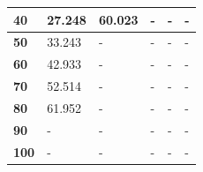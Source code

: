 \begin{table}[H]
\begin{tabular}{|l|l|l|l|l|l|}
\textbf{40}                               & 27.248          & 60.023           & -                & -                & -                \\ \hline
\textbf{50}                               & 33.243          & -                & -                & -                & -                \\ \hline
\textbf{60}                               & 42.933          & -                & -                & -                & -                \\ \hline
\textbf{70}                               & 52.514          & -                & -                & -                & -                \\ \hline
\textbf{80}                               & 61.952          & -                & -                & -                & -                \\ \hline
\textbf{90}                               & -               & -                & -                & -                & -                \\ \hline
\textbf{100}                              & -               & -                & -                & -                & -                \\ \hline
\end{tabular}
\end{table}

